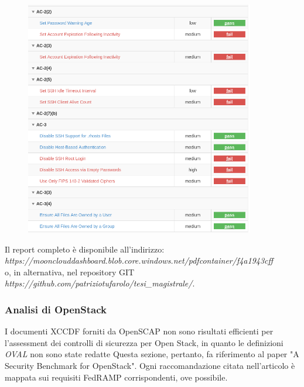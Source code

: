 \documentclass[../main.tex]{subfiles}
\begin{document}
\begin{figure}[H]
    \includegraphics[width=10cm]{immagini/test_oscap_1_1.png}
    \label{Estratto del report}
\end{figure}

Il report completo è disponibile all'indirizzo:\\
\textit{https://moonclouddashboard.blob.core.windows.net/pdfcontainer/f4a1943cff}
\\
o, in alternativa, nel repository GIT\\
\textit{https://github.com/patriziotufarolo/tesi\_magistrale/}.

\subsubsection{Analisi di OpenStack}
I documenti XCCDF forniti da OpenSCAP non sono risultati efficienti per l'assessment dei controlli di sicurezza per Open Stack, in quanto le definizioni \textit{OVAL} non sono state redatte
Questa sezione, pertanto, fa riferimento al paper "A Security Benchmark for OpenStack". Ogni raccomandazione citata nell'articolo è mappata sui requisiti FedRAMP corrispondenti, ove possibile.
\end{document}
